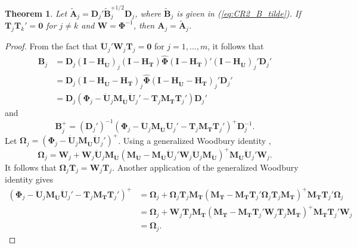 \documentclass[12pt]{article}\usepackage[]{graphicx}\usepackage[]{color}
\newtheorem{thm}{Theorem}
\newcommand{\bm}{\mathbf}
\newcommand{\bs}{\boldsymbol}
\begin{document}
\begin{thm}
\label{thm:absorb}
Let $\bm{\tilde{A}}_j = \bm{D}_j'\bm{\tilde{B}}_j^{+1/2} \bm{D}_j$, where $\bm{\tilde{B}}_j$ is given in (\ref{eq:CR2_B_tilde}). If $\bm{T}_j \bm{T}_k' = \bm{0}$ for $j \neq k$ and $\bm{W} = \bs\Phi^{-1}$, then $\bm{A}_j = \bm{\tilde{A}}_j$. 
\end{thm}

\begin{proof}
From the fact that $\bm{\ddot{U}}_j'\bm{W}_j\bm{T}_j = \bm{0}$ for $j = 1,...,m$, it follows that \begin{align*}
\bm{B}_j &= \bm{D}_j \left(\bm{I} - \bm{H_{\ddot{U}}}\right)_j \left(\bm{I} - \bm{H_T}\right) \hat{\bs\Phi} \left(\bm{I} - \bm{H_T}\right)' \left(\bm{I} - \bm{H_{\ddot{U}}}\right)_j' \bm{D}_j'\\
&= \bm{D}_j \left(\bm{I} - \bm{H_{\ddot{U}}} - \bm{H_T}\right)_j \hat{\bs\Phi} \left(\bm{I} - \bm{H_{\ddot{U}}} - \bm{H_T}\right)_j' \bm{D}_j' \\
&= \bm{D}_j \left(\bs\Phi_j - \bm{\ddot{U}}_j \bm{M_{\ddot{U}}}\bm{\ddot{U}}_j' - \bm{T}_j \bm{M_T}\bm{T}_j'\right)\bm{D}_j'
\end{align*}
and 
\begin{equation}
\label{eq:B_j_inverse}
\bm{B}_j^+ = \left(\bm{D}_j'\right)^{-1} \left(\bs\Phi_j - \bm{\ddot{U}}_j \bm{M_{\ddot{U}}}\bm{\ddot{U}}_j' - \bm{T}_j \bm{M_T}\bm{T}_j'\right)^+ \bm{D}_j^{-1}.
\end{equation}
Let $\bs\Omega_j = \left(\bs\Phi_j - \bm{\ddot{U}}_j \bm{M_{\ddot{U}}}\bm{\ddot{U}}_j'\right)^+$.
Using a generalized Woodbury identity \citep{Henderson1981on}, \[
\bs\Omega_j = \bm{W}_j + \bm{W}_j \bm{\ddot{U}}_j \bm{M_{\ddot{U}}}\left(\bm{M_{\ddot{U}}} - \bm{M_{\ddot{U}}} \bm{\ddot{U}}_j' \bm{W}_j \bm{\ddot{U}}_j \bm{M_{\ddot{U}}}\right)^+ \bm{M_{\ddot{U}}}\bm{\ddot{U}}_j'\bm{W}_j. \]
It follows that $\bs\Omega_j \bm{T}_j = \bm{W}_j \bm{T}_j$. 
Another application of the generalized Woodbury identity gives 
\begin{align*}
\left(\bs\Phi_j - \bm{\ddot{U}}_j \bm{M_{\ddot{U}}}\bm{\ddot{U}}_j' - \bm{T}_j \bm{M_T}\bm{T}_j'\right)^+ &= \bs\Omega_j + \bs\Omega_j \bm{T}_j \bm{M_T}\left(\bm{M_T} - \bm{M_T}\bm{T}_j' \bs\Omega_j \bm{T}_j \bm{M_T}\right)^+ \bm{M_T} \bm{T}_j' \bs\Omega_j \\
&= \bs\Omega_j + \bm{W}_j \bm{T}_j \bm{M_T}\left(\bm{M_T} - \bm{M_T}\bm{T}_j' \bm{W}_j \bm{T}_j\bm{M_T}\right)^+ \bm{M_T} \bm{T}_j' \bm{W}_j \\
&= \bs\Omega_j.
\end{align*}

\end{proof}
\end{document}
